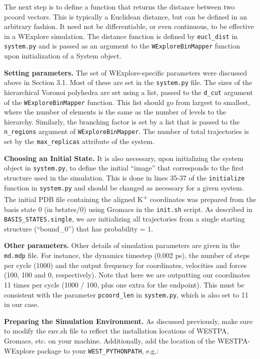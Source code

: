 \documentclass[9pt,tutorial,ASAPversion]{livecoms}
\begin{document}
The next step is to define a function that returns the distance between two pcoord vectors. 
This is typically a Euclidean distance, but can be defined in an arbitrary fashion. 
It need not be differentiable, or even continuous, to be effective in a WExplore simulation. 
The distance function is defined by \verb|eucl_dist| in \verb|system.py| and is passed as an argument to the \verb|WExploreBinMapper| function upon initialization of a System object.

\textbf{Setting parameters.} The set of WExplore-specific parameters were discussed above in Section 3.1. 
Most of these are set in the \verb|system.py| file. The sizes of the hierarchical Voronoi polyhedra are set using a list, passed to the \verb|d_cut| argument of the \verb|WExploreBinMapper| function. 
This list should go from largest to smallest, where the number of elements is the same as the number of levels to the hierarchy. 
Similarly, the branching factor is set by a list that is passed to the \verb|n_regions| argument of \verb|WExploreBinMapper|. 
The number of total trajectories is set by the \verb|max_replicas| attribute of the system.

\textbf{Choosing an Initial State.} It is also necessary, upon initializing the system object in \verb|system.py|, to define the initial “image” that corresponds to the first structure used in the simulation. 
This is done in lines 35-37 of the \verb|initialize| function in \verb|system.py| and should be changed as necessary for a given system. 
The initial PDB file containing the aligned K\textsuperscript{+} coordinates was prepared from the basis state 0 (in bstates/0) using Gromacs in the \verb|init.sh| script. 
As described in \verb|BASIS_STATES.single|, we are initializing all trajectories from a single starting structure (“bound\_0”) that has probability = 1.

\textbf{Other parameters.} Other details of simulation parameters are given in the \verb|md.mdp| file. 
For instance, the dynamics timestep (0.002 ps), the number of steps per cycle (1000) and the output frequency for coordinates, velocities and forces (100, 100 and 0, respectively). 
Note that here we are outputting our coordinates 11 times per cycle (1000 / 100, plus one extra for the endpoint). 
This must be consistent with the parameter \verb|pcoord_len| in \verb|system.py|, which is also set to 11 in our case.

\textbf{Preparing the Simulation Environment.} As discussed previously, make sure to modify the env.sh file to reflect the installation locations of WESTPA, Gromacs, etc. on your machine. 
Additionally, add the location of the WESTPA-WExplore package to your \verb|WEST_PYTHONPATH|, e.g.:
\end{document}
